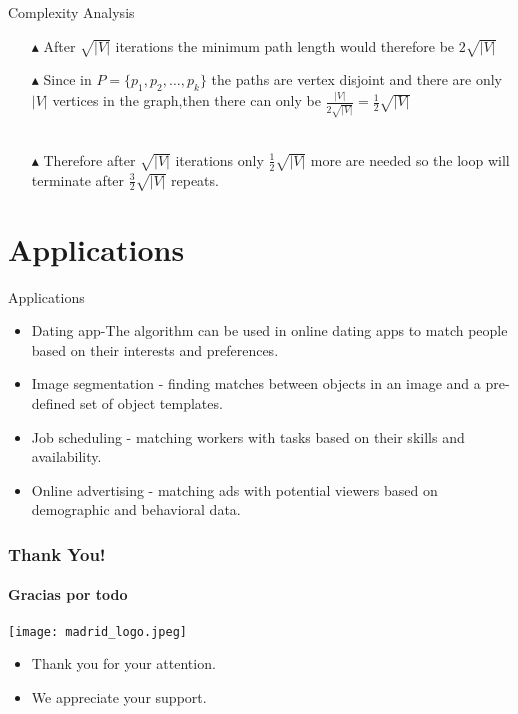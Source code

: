 \documentclass{beamer}
\begin{document}
\begin{frame}{Complexity Analysis}
\begin{itemize}
      \item[$\blacktriangle$]After $\sqrt{|V|}$ iterations the minimum path length would therefore be $2\sqrt{|V|}$\\
    \vspace{.5cm}
     \item[$\blacktriangle$]Since in $P=\{p_1,p_2,\dots,p_k\}$ the paths are vertex disjoint and there are only $|V|$ vertices in the graph,then there can only be $\frac{|V|}{2\sqrt{|V|}}=\frac{1}{2}\sqrt{|V|}$\\ \\
    \vspace{.5cm}
    
    \item[$\blacktriangle$] Therefore after $\sqrt{|V|}$ iterations only $\frac{1}{2}\sqrt{|V|}$ more are needed so the loop will terminate after $\frac{3}{2}\sqrt{|V|}$ repeats.\\
\end{itemize}

\end{frame}

\section{Applications}
\begin{frame}{Applications}
    \begin{itemize}
        \item<1-> \alert{Dating app}-The algorithm can be used in online dating apps to match people based on their interests and preferences.
        \item<2-> \alert{Image segmentation} - finding matches between objects in an image and a pre-defined set of object templates.
        \item<3-> \alert{Job scheduling} - matching workers with tasks based on their skills and availability.
        \item<4-> \alert{Online advertising} - matching ads with potential viewers based on demographic and behavioral data.
    \end{itemize}
\end{frame}





\begin{frame}
\frametitle{Thank You!}
\framesubtitle{Gracias por todo}

\begin{center}
\texttt{[image: madrid\_logo.jpeg]}
\end{center}

\begin{itemize}
\item Thank you for your attention.
\item We appreciate your support.
\end{itemize}


\end{frame}
\end{document}
